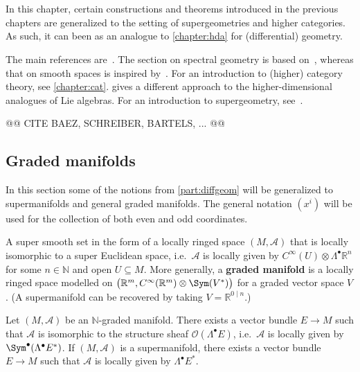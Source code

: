\chapter{}\label{chapter:hdg}

    In this chapter, certain constructions and theorems introduced in the previous chapters are generalized to the setting of supergeometries and higher categories. As such, it can been as an analogue to \cref{chapter:hda} for (differential) geometry.

    The main references are~\citet{schreiber_loop_2005,baez_higher_2005}. The section on spectral geometry is based on~\citet{sanders_commutative_2012}, whereas that on smooth spaces is inspired by~\citet{baez_convenient_2011}. For an introduction to (higher) category theory, see \cref{chapter:cat}.  gives a different approach to the higher-dimensional analogues of Lie algebras. For an introduction to supergeometry, see~\citet{cattaneo_introduction_2011}.

    @@ CITE BAEZ, SCHREIBER, BARTELS, ... @@

\section{Graded manifolds}

    In this section some of the notions from \cref{part:diffgeom} will be generalized to supermanifolds and general graded manifolds. The general notation $(x^i)$ will be used for the collection of both even and odd coordinates.

    \begin{example}[Supermanifold]\label{hdg:supermanifold}
        A super smooth set in the form of a locally ringed space $(M,\mathcal{A})$ that is locally isomorphic to a super Euclidean space, i.e.~$\mathcal{A}$ is locally given by $C^\infty(U)\otimes\Lambda^\bullet\mathbb{R}^n$ for some $n\in\mathbb{N}$ and open $U\subseteq M$. More generally, a \textbf{graded manifold} is a locally ringed space modelled on $\bigl(\mathbb{R}^m,C^\infty(\mathbb{R}^m)\otimes\Sym(V^*)\bigr)$ for a graded vector space $V$. (A supermanifold can be recovered by taking $V=\mathbb{R}^{0\mid n}$.)
    \end{example}

    \begin{theorem}[Batchelor]
        Let $(M,\mathcal{A})$ be an $\mathbb{N}$-graded manifold. There exists a vector bundle $E\rightarrow M$ such that $\mathcal{A}$ is isomorphic to the structure sheaf $\mathcal{O}(\Lambda^\bullet E)$, i.e.~$\mathcal{A}$ is locally given by $\Sym^\bullet(\Lambda^\bullet E^*)$. If $(M,\mathcal{A})$ is a supermanifold, there exists a vector bundle $E\rightarrow M$ such that $\mathcal{A}$ is locally given by $\Lambda^\bullet E^*$.
    \end{theorem}

